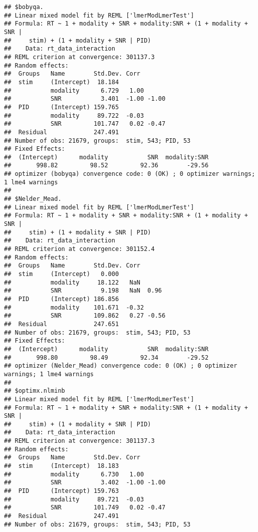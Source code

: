 \documentclass[
]{article}
\begin{document}
\begin{verbatim}
## $bobyqa.
## Linear mixed model fit by REML ['lmerModLmerTest']
## Formula: RT ~ 1 + modality + SNR + modality:SNR + (1 + modality + SNR |  
##     stim) + (1 + modality + SNR | PID)
##    Data: rt_data_interaction
## REML criterion at convergence: 301137.3
## Random effects:
##  Groups   Name        Std.Dev. Corr       
##  stim     (Intercept)  18.184             
##           modality      6.729   1.00      
##           SNR           3.401  -1.00 -1.00
##  PID      (Intercept) 159.765             
##           modality     89.722  -0.03      
##           SNR         101.747   0.02 -0.47
##  Residual             247.491             
## Number of obs: 21679, groups:  stim, 543; PID, 53
## Fixed Effects:
##  (Intercept)      modality           SNR  modality:SNR  
##       998.82         98.52         92.36        -29.56  
## optimizer (bobyqa) convergence code: 0 (OK) ; 0 optimizer warnings; 1 lme4 warnings 
## 
## $Nelder_Mead.
## Linear mixed model fit by REML ['lmerModLmerTest']
## Formula: RT ~ 1 + modality + SNR + modality:SNR + (1 + modality + SNR |  
##     stim) + (1 + modality + SNR | PID)
##    Data: rt_data_interaction
## REML criterion at convergence: 301152.4
## Random effects:
##  Groups   Name        Std.Dev. Corr       
##  stim     (Intercept)   0.000             
##           modality     18.122   NaN       
##           SNR           9.198   NaN  0.96 
##  PID      (Intercept) 186.856             
##           modality    101.671  -0.32      
##           SNR         109.862   0.27 -0.56
##  Residual             247.651             
## Number of obs: 21679, groups:  stim, 543; PID, 53
## Fixed Effects:
##  (Intercept)      modality           SNR  modality:SNR  
##       998.80         98.49         92.34        -29.52  
## optimizer (Nelder_Mead) convergence code: 0 (OK) ; 0 optimizer warnings; 1 lme4 warnings 
## 
## $optimx.nlminb
## Linear mixed model fit by REML ['lmerModLmerTest']
## Formula: RT ~ 1 + modality + SNR + modality:SNR + (1 + modality + SNR |  
##     stim) + (1 + modality + SNR | PID)
##    Data: rt_data_interaction
## REML criterion at convergence: 301137.3
## Random effects:
##  Groups   Name        Std.Dev. Corr       
##  stim     (Intercept)  18.183             
##           modality      6.730   1.00      
##           SNR           3.402  -1.00 -1.00
##  PID      (Intercept) 159.763             
##           modality     89.721  -0.03      
##           SNR         101.749   0.02 -0.47
##  Residual             247.491             
## Number of obs: 21679, groups:  stim, 543; PID, 53

\end{verbatim}
\end{document}

